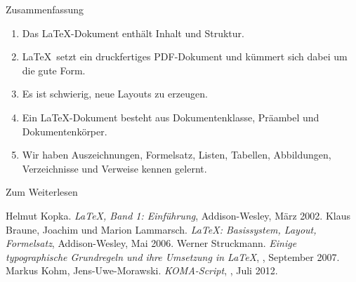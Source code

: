 \begin{frame}{Zusammenfassung}
  \begin{enumerate}
    \item Das \alert{\LaTeX-Dokument} enthält \alert{Inhalt und Struktur}.
    \item \LaTeX\ setzt ein druckfertiges \alert{PDF-Dokument} und kümmert sich dabei um die \alert{gute Form}.
    \item Es ist schwierig, \alert{neue Layouts} zu erzeugen.
    \item Ein \LaTeX-Dokument besteht aus \alert{Dokumentenklasse}, \alert{Präambel} und \alert{Dokumentenkörper}.
    \item Wir haben \alert{Auszeichnungen}, \alert{Formelsatz}, \alert{Listen}, \alert{Tabellen}, \alert{Abbildungen}, \alert{Verzeichnisse} und \alert{Verweise} kennen gelernt.
  \end{enumerate}
\end{frame}

\begin{Frame}[fragile]{Zum Weiterlesen}
  \begin{mybib}
      Helmut Kopka.
      \newblock \emph{\LaTeX, Band 1: Einführung},
      \newblock Addison-Wesley, März 2002.
      Klaus Braune, Joachim und Marion Lammarsch.
      \newblock \emph{\LaTeX: Basissystem, Layout, Formelsatz},
      \newblock Addison-Wesley, Mai 2006.
      Werner Struckmann.
      \newblock \emph{Einige typographische Grundregeln und ihre Umsetzung in \LaTeX},
      \newblock {}, September 2007.
      Markus Kohm, Jens-Uwe-Morawski.
      \newblock \emph{KOMA-Script},
      \newblock {}, Juli 2012.
  \end{mybib}
\end{Frame}